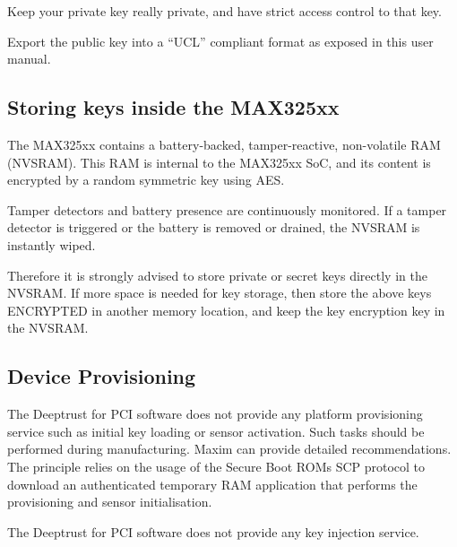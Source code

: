 Keep your private key really private, and have strict access control to that key.
\begin{DoxyItemize}
\item Export the public key into a “\+U\+C\+L” compliant format as exposed in this user manual.
\end{DoxyItemize}\hypertarget{_p_c_i_g_u_i_d_a_n_c_e_sub_keystor}{}\subsection{Storing keys inside the M\+A\+X325xx}\label{_p_c_i_g_u_i_d_a_n_c_e_sub_keystor}
The M\+A\+X325xx contains a battery-\/backed, tamper-\/reactive, non-\/volatile R\+AM (N\+V\+S\+R\+AM). This R\+AM is internal to the M\+A\+X325xx SoC, and its content is encrypted by a random symmetric key using A\+ES.

Tamper detectors and battery presence are continuously monitored. If a tamper detector is triggered or the battery is removed or drained, the N\+V\+S\+R\+AM is instantly wiped.

Therefore it is strongly advised to store private or secret keys directly in the N\+V\+S\+R\+AM. If more space is needed for key storage, then store the above keys E\+N\+C\+R\+Y\+P\+T\+ED in another memory location, and keep the key encryption key in the N\+V\+S\+R\+AM.\hypertarget{_p_c_i_g_u_i_d_a_n_c_e_sub_prov}{}\subsection{Device Provisioning}\label{_p_c_i_g_u_i_d_a_n_c_e_sub_prov}
The Deeptrust for P\+CI software does not provide any platform provisioning service such as initial key loading or sensor activation. Such tasks should be performed during manufacturing. Maxim can provide detailed recommendations. The principle relies on the usage of the Secure Boot R\+OM\textquotesingle{}s S\+CP protocol to download an authenticated temporary R\+AM application that performs the provisioning and sensor initialisation.

The Deeptrust for P\+CI software does not provide any key injection service.


